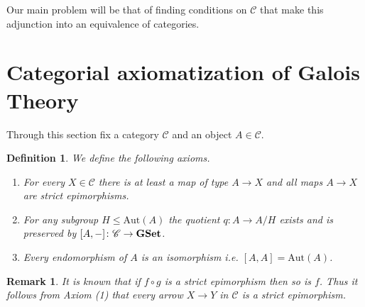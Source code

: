 \documentclass[italian, 12pt, reqno]{article}
\theoremstyle{myteo}
\newtheorem{definition}[theorem]{Definition}
\newtheorem{remark}[theorem]{Remark}
\numberwithin{equation}{section}
\newcommand{\cat}[1]{\mathscr{#1}}
\newcommand{\aut}{\text{Aut}}
\newcommand{\gset}{\text{\textbf{GSet}}}
\newcommand{\homs}[2]{[#1, #2]}
\newcommand{\fun}[3]{#1\colon#2\to #3}
\begin{document}
\begin{figure}[h]
  \begin{center}
    \hspace{2cm}
  \end{center}
  \caption{}
  \label{diagram:bijection}
\end{figure}

Our main problem will be that of finding conditions on \(\cat{C}\) that make this adjunction into an equivalence of categories.

\section{Categorial axiomatization of Galois Theory}
\label{sec:axioms}

Through this section fix a category \(\cat{C}\) and an object \(A\in\cat{C}\).

\begin{definition}
  \label{def:axioms}
  We define the following axioms.
  \begin{enumerate}
  \item For every \(X\in\cat{C}\) there is at least a map of type \(A\to X\) and all maps \(A\to X\) are strict epimorphisms.
  \item For any subgroup \(H\leq \aut(A)\) the quotient \(\fun{q}{A}{A/H}\) exists and is preserved by \(\fun{\homs{A}{-}}{\cat{C}}{\gset}\).
  \item Every endomorphism of \(A\) is an isomorphism i.e. \(\homs{A}{A} = \aut(A)\).
  \end{enumerate}
\end{definition}

\begin{remark}
  \label{rem:all_strict_epi}
  It is known that if \(f\circ g\) is a strict epimorphism then so is \(f\).
  Thus it follows from Axiom (1) that every arrow \(X\to Y\) in \(\cat{C}\) is a strict epimorphism.
\end{remark}
\end{document}
